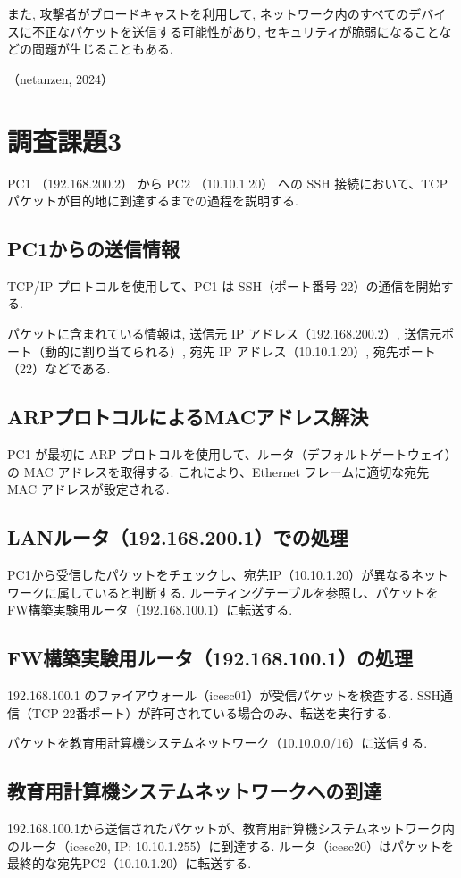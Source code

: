 \documentclass{ltjsarticle} %
\begin{document}
\vspace{0.5cm}

また, 攻撃者がブロードキャストを利用して, ネットワーク内のすべてのデバイスに不正なパケットを送信する可能性があり, 
セキュリティが脆弱になることなどの問題が生じることもある. 

（netanzen, 2024）


\section{調査課題3}
PC1 （192.168.200.2） から PC2 （10.10.1.20） への SSH 接続において、TCP パケットが目的地に到達するまでの過程を説明する. 

\subsection{PC1からの送信情報}
TCP/IP プロトコルを使用して、PC1 は SSH（ポート番号 22）の通信を開始する. 

パケットに含まれている情報は, 送信元 IP アドレス（192.168.200.2）, 送信元ポート（動的に割り当てられる）, 
宛先 IP アドレス（10.10.1.20）, 宛先ポート（22）などである. 

\subsection{ARPプロトコルによるMACアドレス解決}
PC1 が最初に ARP プロトコルを使用して、ルータ（デフォルトゲートウェイ）の MAC アドレスを取得する. 
これにより、Ethernet フレームに適切な宛先 MAC アドレスが設定される. 

\subsection{LANルータ（192.168.200.1）での処理}
PC1から受信したパケットをチェックし、宛先IP（10.10.1.20）が異なるネットワークに属していると判断する. 
ルーティングテーブルを参照し、パケットをFW構築実験用ルータ（192.168.100.1）に転送する. 

\subsection{FW構築実験用ルータ（192.168.100.1）の処理}
192.168.100.1 のファイアウォール（icesc01）が受信パケットを検査する. 
SSH通信（TCP 22番ポート）が許可されている場合のみ、転送を実行する. 

パケットを教育用計算機システムネットワーク（10.10.0.0/16）に送信する. 

\subsection{教育用計算機システムネットワークへの到達}
192.168.100.1から送信されたパケットが、教育用計算機システムネットワーク内のルータ（icesc20, IP: 10.10.1.255）に到達する. 
ルータ（icesc20）はパケットを最終的な宛先PC2（10.10.1.20）に転送する. 
\end{document}
